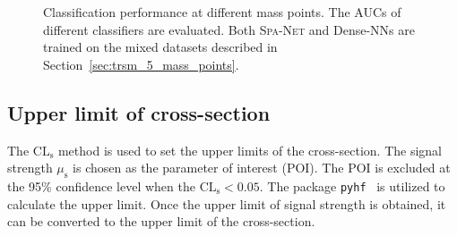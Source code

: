 \documentclass[12pt]{article}
\begin{document}
        \begin{figure}[htpb]
            \centering
            \caption{Classification performance at different mass points. The AUCs of different classifiers are evaluated. Both \textsc{Spa-Net} and Dense-NNs are trained on the mixed datasets described in Section~\ref{sec:trsm_5_mass_points}.}  
            \label{fig:classification_performance_each_mass_point-TRSM-mix_5-250k}  
        \end{figure}
    \subsection{Upper limit of cross-section}%
    \label{sub:upper_limit_of_cross_section}
        The $\text{CL}_{\text{s}}$ method is used to set the upper limits of the cross-section. The signal strength $\mu_{\text{s}}$ is chosen as the parameter of interest (POI). The POI is excluded at the 95\% confidence level when the $\text{CL}_{\text{s}} < 0.05$. The package \verb|pyhf|~\cite{pyhf,pyhf_joss} is utilized to calculate the upper limit. Once the upper limit of signal strength is obtained, it can be converted to the upper limit of the cross-section.
\end{document}
